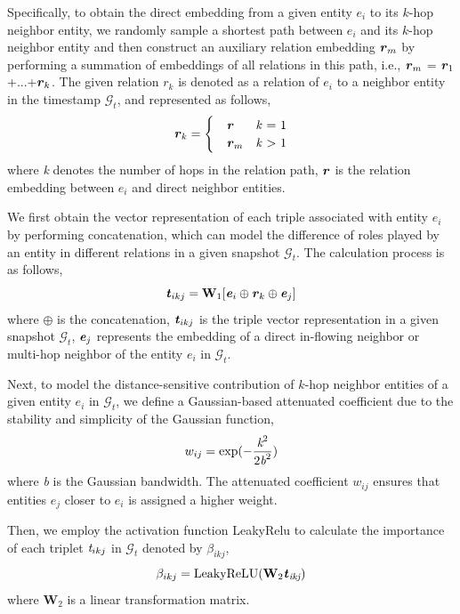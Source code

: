 \documentclass[sigconf,natbib=true]{acmart}
\begin{document}
Specifically, to obtain the direct embedding from a given entity $e_i$ to its $k$-hop neighbor entity, we randomly sample a shortest path between $e_i$ and its $k$-hop neighbor entity \cite{DeepPath} and then construct an auxiliary relation embedding $\textbf{\emph{r}}_{m}$ by performing a summation of embeddings of all relations in this path, i.e., $\textbf{\emph{r}}_{m}$ = $\textbf{\emph{r}}_{1}$+...+$\textbf{\emph{r}}_{k}$. The given relation $r_k$ is denoted as a relation of $e_i$ to a neighbor entity in the timestamp $\mathcal{G}_t$, and represented as follows, 
\begin{equation}
 \textbf{\emph{r}}_{k}=
\begin{cases}
\quad \textbf{\emph{r}} & \text{\emph{k} = 1}\\
\quad \textbf{\emph{r}}_{m}&  \text{\emph{k} > 1}
\end{cases}
\end{equation}
where \emph{k} denotes the number of hops in the relation path, $\textbf{\emph{r}}$ is the relation embedding between $e_i$ and direct  neighbor entities. 

We first obtain the vector representation of each triple associated with entity $e_i$ by performing concatenation, which can model the difference of roles played by an entity in different relations in a given snapshot $\mathcal{G}_t$. The calculation process is as follows, 
\begin{equation}
\textbf{\emph{t}}_{ikj} = \textbf{W}_1[\textbf{\emph{e}}_{i}\oplus\textbf{\emph{r}}_{k}\oplus\textbf{\emph{e}}_{j}]
\end{equation}
where $\oplus$ is the concatenation, $\textbf{\emph{t}}_{ikj}$ is the triple vector representation in a given snapshot $\mathcal{G}_t$, $\textbf{\emph{e}}_{j}$ represents the embedding of a direct in-flowing neighbor or multi-hop neighbor of the entity $e_i$ in $\mathcal{G}_t$. 

Next, to model the distance-sensitive contribution of $k$-hop neighbor entities of a given entity $e_i$ in $\mathcal{G}_t$, we define a Gaussian-based attenuated coefficient due to the stability and simplicity of the Gaussian function, 
\begin{equation}
	w_{ij} = \rm{exp} (-\frac{\emph{k}^{2}}{2\emph{b}^2})
\end{equation}
where \emph{b} is the Gaussian bandwidth.  The attenuated coefficient $w_{ij}$ ensures that entities $e_j$ closer to $e_i$ is assigned a higher weight.

Then, we employ the activation function LeakyRelu to calculate the importance of each triplet $\emph{t}_{ikj}$ in $\mathcal{G}_t$  denoted by $\beta_{ikj}$,   
\begin{equation}
 \beta_{ikj} = \rm{LeakyReLU}(\textbf{W}_2 \textbf{\emph{t}}_{\emph{ikj}})
\end{equation}
where $\textbf{W}_2$ is a linear transformation matrix. 
\end{document}
